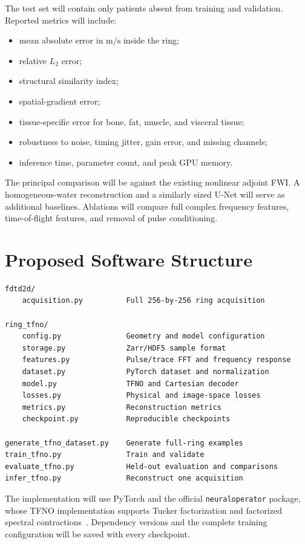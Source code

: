 \documentclass[11pt]{article}
\begin{document}
The test set will contain only patients absent from training and validation.
Reported metrics will include:
\begin{itemize}
  \item mean absolute error in $\mathrm{m/s}$ inside the ring;
  \item relative $L_2$ error;
  \item structural similarity index;
  \item spatial-gradient error;
  \item tissue-specific error for bone, fat, muscle, and visceral tissue;
  \item robustness to noise, timing jitter, gain error, and missing channels;
  \item inference time, parameter count, and peak GPU memory.
\end{itemize}

The principal comparison will be against the existing nonlinear adjoint FWI.
A homogeneous-water reconstruction and a similarly sized U-Net will serve as
additional baselines. Ablations will compare full complex frequency features,
time-of-flight features, and removal of pulse conditioning.

\section{Proposed Software Structure}

\begin{verbatim}
fdtd2d/
    acquisition.py          Full 256-by-256 ring acquisition

ring_tfno/
    config.py               Geometry and model configuration
    storage.py              Zarr/HDF5 sample format
    features.py             Pulse/trace FFT and frequency response
    dataset.py              PyTorch dataset and normalization
    model.py                TFNO and Cartesian decoder
    losses.py               Physical and image-space losses
    metrics.py              Reconstruction metrics
    checkpoint.py           Reproducible checkpoints

generate_tfno_dataset.py    Generate full-ring examples
train_tfno.py               Train and validate
evaluate_tfno.py            Held-out evaluation and comparisons
infer_tfno.py               Reconstruct one acquisition
\end{verbatim}

The implementation will use PyTorch and the official
\texttt{neuraloperator} package, whose TFNO implementation supports Tucker
factorization and factorized spectral contractions~\cite{kossaifi2024}.
Dependency versions and the complete training configuration will be saved with
every checkpoint.
\end{document}
